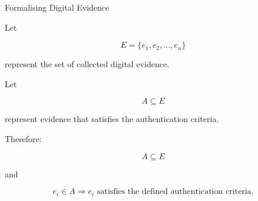 \documentclass[aspectratio=169,11pt]{beamer}
\begin{document}
	
	\begin{frame}{Formalising Digital Evidence}
		
		Let
		
		\[
		E=\{e_1,e_2,\ldots,e_n\}
		\]
		
		represent the set of collected digital evidence.
		
		\vspace{0.3cm}
		
		Let
		
		\[
		A\subseteq E
		\]
		
		represent evidence that satisfies the authentication
		criteria.
		
		\vspace{0.3cm}
		
		Therefore:
		
		\[
		\boxed{A\subseteq E}
		\]
		
		\vspace{0.3cm}
		
		and
		
		\[
		e_i\in A
		\Rightarrow
		e_i\text{ satisfies the defined authentication criteria.}
		\]
		
	\end{frame}
	
	
\end{document}
